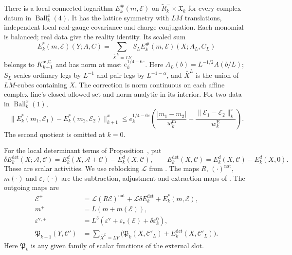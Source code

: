 \begin{theorem}
\begin{enumerate}[label=\textup{(\roman*)},leftmargin=*]
\end{enumerate}

There is a local connected logarithm $E_k^\#(m,\mathscr E)$ on
$\widetilde R_k^-\times\mathfrak X_k$ for every complex datum in
$\operatorname{Ball}_k^x(4)$. It has the lattice symmetry with
$LM$ translations, independent local real-gauge covariance and
charge conjugation. Each monomial is balanced; real data give the
reality identity. Its scaled sum
\[
 E_k^*(m,\mathscr E)(Y;A,C)
   =\sum_{\bar X^L=LY}S_LE_k^\#(m,\mathscr E)(X;A_L,C_L)
\]
belongs to $K_{k+1}^{x,\mathbb C}$ and has norm at most
$e_k^{1/4-6\varepsilon}$. Here $A_L(b)=L^{-1/2}A(b/L)$;
$S_L$ scales ordinary legs by $L^{-1}$ and pair legs by
$L^{-1-\alpha}$, and $\bar X^L$ is the union of $LM$-cubes
containing $X$. The correction is norm continuous on each affine
complex line's closed allowed set and norm analytic in its interior.
For two data in $\operatorname{Ball}_k^x(1)$,
\[
 \|E_k^*(m_1,\mathscr E_1)-E_k^*(m_2,\mathscr E_2)\|_{k+1}^x
 \le e_k^{1/4-6\varepsilon}
 \left(\frac{|m_1-m_2|}{w_k^{\mathrm m}}+
       \frac{\|\mathscr E_1-\mathscr E_2\|_k^x}{w_k^{\mathrm E}}\right).
\]
The second quotient is omitted at $k=0$.

For the local determinant terms of
Proposition~, put
\[
 \delta E_k^{\mathrm{det}}(X;\mathscr A,\mathscr C)
       =E_k^d(X,\mathscr A+\mathscr C)-E_k^d(X,\mathscr C),
 \qquad
 E_k^{\mathrm{det}}(X,\mathscr C)
       =E_k^d(X,\mathscr C)-E_k^d(X,0).
\]
These are scalar activities. We use reblocking
$\mathcal L$ from .
The maps $R$, $(\cdot)^{\mathrm{nat}}$, $m(\cdot)$ and
$\varepsilon_{\mathrm v}(\cdot)$ are the subtraction, adjustment and
extraction maps of \cite[Theorem~A]{NormalizedContraction}.
The outgoing maps are
\begin{align}
 \mathscr E^+&=\mathcal L(R\mathscr E)^{\mathrm{nat}}
                        +\mathcal L\delta E_k^{\mathrm{det}}
                        +E_k^*(m,\mathscr E), \label{eq:rgnl-full-step}\\
 m^+&=L(m+m(\mathscr E)),\\
 \varepsilon^{\mathrm v,+}
       &=L^3(\varepsilon^{\mathrm v}
                  +\varepsilon_{\mathrm v}(\mathscr E)
                                      +\delta\varepsilon_k^0),\\
 \mathfrak P_{k+1}(Y,\mathscr C')
       &=\sum_{\bar X^L=LY}
           \big(\mathfrak P_k(X,\mathscr C'_L)
                          +E_k^{\mathrm{det}}(X,\mathscr C'_L)\big).
                                      \label{eq:rgnl-external-scalar-map}
\end{align}
Here $\mathfrak P_k$ is any given family of scalar
functions of the external slot.



\end{theorem}
